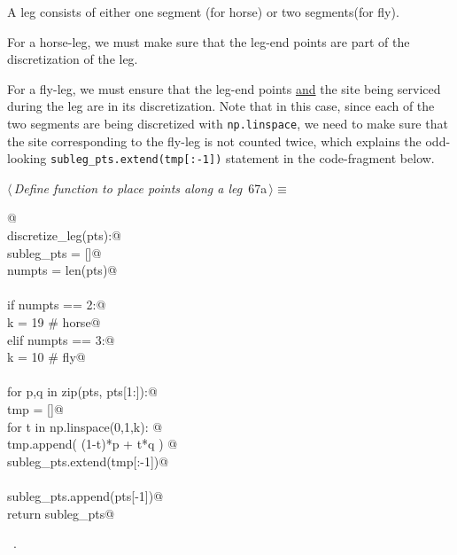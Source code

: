 \documentclass[11.5pt]{report}
\begin{document}
A leg consists of either one segment (for horse) or two segments(for fly). 

For a horse-leg, we must make sure that the leg-end points are part of the discretization of the leg. 

For a fly-leg, we must ensure that the leg-end points \underline{and} the site being 
serviced during the leg are in its discretization. Note that in this case, 
since each of the two segments are being discretized with \verb|np.linspace|, we need
to make sure that the site corresponding to the fly-leg is not counted twice, which
explains the odd-looking \verb|subleg_pts.extend(tmp[:-1])| statement in the code-fragment below. 

\begin{flushleft} \small
\begin{minipage}{\linewidth}\label{scrap96}\raggedright\small
{} $\langle\,${\itshape Define function to place points along a leg}\nobreak\ {\footnotesize {67a}}$\,\rangle\equiv$
\vspace{-1ex}
\begin{list}{}{} \item
\mbox{}\verb@   @\\
\mbox{}\verb@def discretize_leg(pts):@\\
\mbox{}\verb@   subleg_pts = []@\\
\mbox{}\verb@   numpts     = len(pts)@\\
\mbox{}\verb@@\\
\mbox{}\verb@   if numpts == 2:@\\
\mbox{}\verb@       k  = 19 # horse@\\
\mbox{}\verb@   elif numpts == 3:@\\
\mbox{}\verb@       k  = 10 # fly@\\
\mbox{}\verb@@\\
\mbox{}\verb@   for p,q in zip(pts, pts[1:]):@\\
\mbox{}\verb@       tmp = []@\\
\mbox{}\verb@       for t in np.linspace(0,1,k): @\\
\mbox{}\verb@           tmp.append( (1-t)*p + t*q ) @\\
\mbox{}\verb@       subleg_pts.extend(tmp[:-1])@\\
\mbox{}\verb@@\\
\mbox{}\verb@   subleg_pts.append(pts[-1])@\\
\mbox{}\verb@   return subleg_pts@\\
\mbox{}\verb@@{\NWsep}
\end{list}
\vspace{-1.5ex}
\footnotesize
\begin{list}{}{\setlength{\itemsep}{-\parsep}\setlength{\itemindent}{-\leftmargin}}
\item \NWtxtMacroRefIn\ .

\item{}
\end{list}
\end{minipage}\vspace{4ex}
\end{flushleft}
\end{document}
